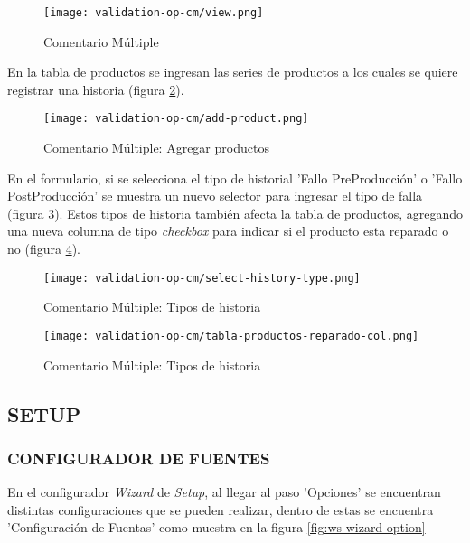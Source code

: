 \begin{figure}[H]
	\centering
	\texttt{[image: validation-op-cm/view.png]}
	\caption{\label{fig:op-view-cm} Comentario Múltiple}
\end{figure}

En la tabla de productos se ingresan las series de productos a los cuales se quiere registrar una historia (figura \ref{fig:op-add-product-cm}).

\begin{figure}[H]
	\centering
	\texttt{[image: validation-op-cm/add-product.png]}
	\caption{\label{fig:op-add-product-cm} Comentario Múltiple: Agregar productos}
\end{figure}

En el formulario, si se selecciona el tipo de historial 'Fallo PreProducción' o 'Fallo PostProducción' se muestra un nuevo selector para ingresar el tipo de falla (figura \ref{fig:op-select-history-type-cm}). Estos tipos de historia también afecta la tabla de productos, agregando una nueva columna de tipo \textit{checkbox} para indicar si el producto esta reparado o no (figura \ref{fig:op-tabla-productos-reparado-col-cm}).

\begin{figure}[H]
	\centering
	\texttt{[image: validation-op-cm/select-history-type.png]}
	\caption{\label{fig:op-select-history-type-cm} Comentario Múltiple: Tipos de historia}
\end{figure}

\begin{figure}[H]
	\centering
	\texttt{[image: validation-op-cm/tabla-productos-reparado-col.png]}
	\caption{\label{fig:op-tabla-productos-reparado-col-cm} Comentario Múltiple: Tipos de historia}
\end{figure}

\subsection{SETUP}

\subsubsection{CONFIGURADOR DE FUENTES}

En el configurador \textit{Wizard} de \textit{Setup}, al llegar al paso 'Opciones' se encuentran distintas configuraciones que se pueden realizar, dentro de estas se encuentra 'Configuración de Fuentas' como muestra en la figura \ref{fig:ws-wizard-option}

